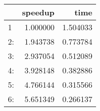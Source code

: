 \begin{tabular}{lrr}
\toprule
{} &   speedup &      time \\
\midrule
1  &  1.000000 &  1.504033 \\
2: &  1.943738 &  0.773784 \\
3: &  2.937054 &  0.512089 \\
4: &  3.928148 &  0.382886 \\
5: &  4.766144 &  0.315566 \\
6: &  5.651349 &  0.266137 \\
\bottomrule
\end{tabular}
